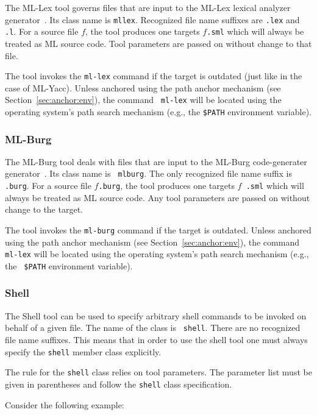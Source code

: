 \documentclass[titlepage,letterpaper]{article}
\begin{document}
The ML-Lex tool governs files that are input to the ML-Lex lexical
analyzer generator~\cite{appel89:lex}.  Its class name is {\tt mllex}.
Recognized file name suffixes are {\tt .lex} and {\tt .l}.  For a
source file $f$, the tool produces one targets $f${\tt .sml} which
will always be treated as ML source code.  Tool parameters are passed
on without change to that file.

The tool invokes the {\tt ml-lex} command if the target is outdated
(just like in the case of ML-Yacc).  Unless anchored using the path
anchor mechanism (see Section~\ref{sec:anchor:env}), the command {\tt
ml-lex} will be located using the operating system's path search
mechanism (e.g., the {\tt \$PATH} environment variable).

\subsubsection{ML-Burg}

The ML-Burg tool deals with files that are input to the ML-Burg
code-generater generator~\cite{mlburg93}.  Its class name is {\tt
mlburg}.  The only recognized file name suffix is {\tt .burg}.  For a
source file $f${\tt .burg}, the tool produces one targets $f${\tt
.sml} which will always be treated as ML source code.  Any tool
parameters are passed on without change to the target.

The tool invokes the {\tt ml-burg} command if the target is outdated.
Unless anchored using the path anchor mechanism (see
Section~\ref{sec:anchor:env}), the command {\tt ml-lex} will be located
using the operating system's path search mechanism (e.g., the {\tt
\$PATH} environment variable).

\subsubsection{Shell}

The Shell tool can be used to specify arbitrary shell commands to be
invoked on behalf of a given file.  The name of the class is {\tt
shell}.  There are no recognized file name suffixes.  This means that
in order to use the shell tool one must always specify the {\tt shell}
member class explicitly.

The rule for the {\tt shell} class relies on tool parameters.  The
parameter list must be given in parentheses and follow the {\tt shell}
class specification.

Consider the following example:
\end{document}
